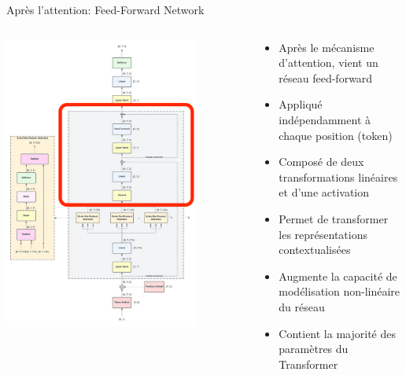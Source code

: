 \documentclass[aspectratio=169]{beamer}
\begin{document}
\begin{frame}{Après l'attention: Feed-Forward Network}
    \begin{columns}
        \begin{column}{0.4\textwidth}
            \begin{center}
                \includegraphics[width=0.8\textwidth]{images/post_attn.png}
            \end{center}
        \end{column}
        \begin{column}{0.6\textwidth}
            \begin{itemize}
                \item Après le mécanisme d'attention, vient un réseau feed-forward
                \item Appliqué indépendamment à chaque position (token)
                \item Composé de deux transformations linéaires et d'une activation
                \item Permet de transformer les représentations contextualisées
                \item Augmente la capacité de modélisation non-linéaire du réseau
                \item Contient la majorité des paramètres du Transformer
            \end{itemize}
        \end{column}
    \end{columns}
\end{frame}
\end{document}
